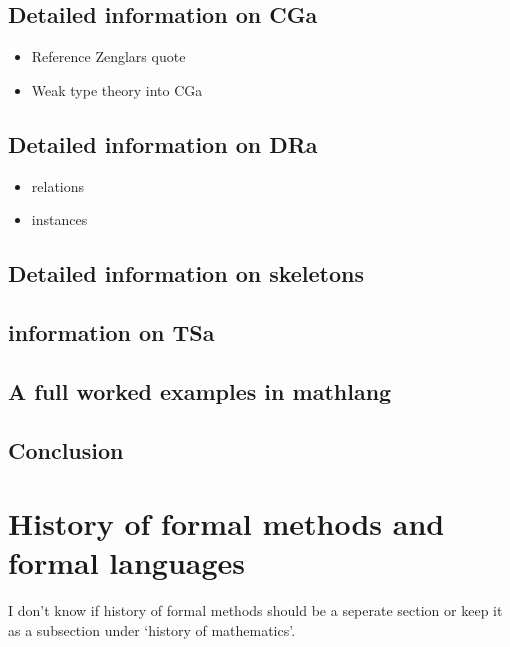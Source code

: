 \subsection{Detailed information on CGa}

\begin{itemize}
\item Reference Zenglars quote

\item Weak type theory into CGa

\end{itemize}

\subsection{Detailed information on DRa}

\begin{itemize}
\item relations

\item instances
\end{itemize}

\subsection{Detailed information on skeletons}

\subsection{information on TSa}

\subsection{A full worked examples in mathlang}

\subsection{Conclusion}

\section{History of formal methods and formal languages}

{\color{red}I don't know if history of formal methods should be a seperate section or keep it as a subsection under `history of mathematics'.}


